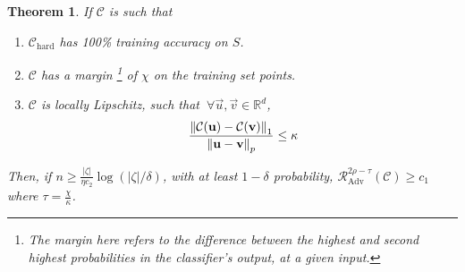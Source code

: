\documentclass{ociamthesis}
\newtheorem{theorem}{Theorem}
\begin{document}
\begin{theorem}
    If $\mathcal{C}$ is such that 
    \begin{enumerate}
        \item $\mathcal{C}_\text{hard}$ has 100\% training accuracy on $S$. 
        \item $\mathcal{C}$ has a margin \footnote{The margin here refers to the
        difference between the highest and second highest probabilities in the
        classifier's output, at a given input.} of $\chi$ on the training set
        points.
        \item $\mathcal{C}$ is locally Lipschitz, such that $~\forall \vec{u},
        \vec{v} \in \mathbb{R}^d$,
            \begin{equation*}
                \frac{\mathrm{\left\lVert\mathcal{C}({\mathbf{u}}) - \mathcal{C}({\mathbf{v}})
                \right\rVert}_1}
                    {\mathrm{\left\lVert{\mathbf{u}} - {\mathbf{v}}\right\rVert}_p} 
                \leq \kappa
            \end{equation*}
    \end{enumerate}
    Then, if $n \geq \frac{|\zeta|}{\eta c_2} \log (|\zeta|/\delta)$, with at
    least $1-\delta$ probability,
    $\mathcal{R}_{\text{Adv}}^{2\rho-\tau}(\mathcal{C}) \geq c_1$ where $\tau =
    \frac{\chi}{\kappa}$.
\end{theorem}
\end{document}
